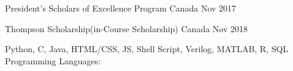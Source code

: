 


\begin{cvhonors}

  \cvhonor
    {}
    {President’s Scholars of Excellence Program} %
    {Canada} %
    {Nov 2017} %

  \cvhonor
    {}
    {Thompson Scholarship(in-Course Scholarship)} %
    {Canada} %
    {Nov 2018} %

  \cvhonor
    {}
    {Python, C, Java, HTML/CSS, JS, Shell Script, Verilog, MATLAB, R, SQL} %
    {}
    {Programming Languages:}

\end{cvhonors}
